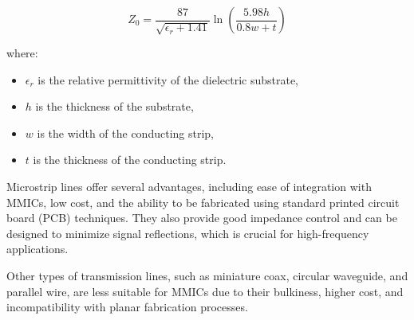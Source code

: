 \[
Z_0 = \frac{87}{\sqrt{\epsilon_r + 1.41}} \ln\left(\frac{5.98h}{0.8w + t}\right)
\]

where:
\begin{itemize}
    \item \( \epsilon_r \) is the relative permittivity of the dielectric substrate,
    \item \( h \) is the thickness of the substrate,
    \item \( w \) is the width of the conducting strip,
    \item \( t \) is the thickness of the conducting strip.
\end{itemize}

Microstrip lines offer several advantages, including ease of integration with MMICs, low cost, and the ability to be fabricated using standard printed circuit board (PCB) techniques. They also provide good impedance control and can be designed to minimize signal reflections, which is crucial for high-frequency applications.

Other types of transmission lines, such as miniature coax, circular waveguide, and parallel wire, are less suitable for MMICs due to their bulkiness, higher cost, and incompatibility with planar fabrication processes.

